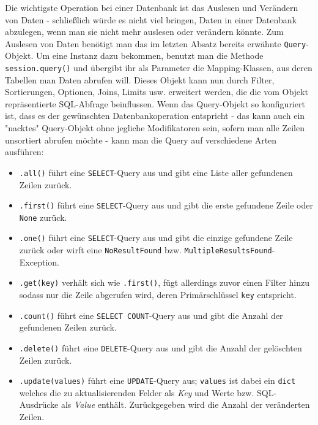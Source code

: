 Die wichtigste Operation bei einer Datenbank ist das Auslesen und Verändern von
Daten - schließlich würde es nicht viel bringen, Daten in einer Datenbank
abzulegen, wenn man sie nicht mehr auslesen oder verändern könnte. Zum Auslesen
von Daten benötigt man das im letzten Absatz bereits erwähnte
\texttt{Query}-Objekt. Um eine Instanz dazu bekommen, benutzt man die Methode
\texttt{session.query()} und übergibt ihr als Parameter die Mapping-Klassen, aus
deren Tabellen man Daten abrufen will. Dieses Objekt kann nun durch Filter,
Sortierungen, Optionen, Joins, Limits usw. erweitert werden, die die vom Objekt
repräsentierte SQL-Abfrage beinflussen. Wenn das Query-Objekt so konfiguriert
ist, dass es der gewünschten Datenbankoperation entspricht - das kann auch ein
"nacktes" Query-Objekt ohne jegliche Modifikatoren sein, sofern man alle Zeilen
unsortiert abrufen möchte - kann man die Query auf verschiedene Arten ausführen:
\begin{itemize}
\item \texttt{.all()} führt eine \texttt{SELECT}-Query aus und gibt eine Liste aller gefundenen
Zeilen zurück.

\item \texttt{.first()} führt eine \texttt{SELECT}-Query aus und gibt die erste gefundene
Zeile oder \texttt{None} zurück.

\item \texttt{.one()} führt eine \texttt{SELECT}-Query aus und gibt die einzige gefundene
Zeile zurück oder wirft eine \texttt{NoResultFound} bzw.
\texttt{MultipleResultsFound}-Exception.

\item \texttt{.get(key)} verhält sich wie \texttt{.first()}, fügt allerdings
zuvor einen Filter hinzu sodass nur die Zeile abgerufen wird, deren
Primärschlüssel \texttt{key} entspricht.

\item \texttt{.count()} führt eine \texttt{SELECT COUNT}-Query aus und gibt die
Anzahl der gefundenen Zeilen zurück.

\item \texttt{.delete()} führt eine \texttt{DELETE}-Query aus und gibt die Anzahl der
gelöschten Zeilen zurück.

\item \texttt{.update(values)} führt eine \texttt{UPDATE}-Query aus;
\texttt{values} ist dabei ein \texttt{dict} welches die zu aktualisierenden
Felder als \emph{Key} und Werte bzw. SQL-Ausdrücke als \emph{Value} enthält.
Zurückgegeben wird die Anzahl der veränderten Zeilen.
\end{itemize}

